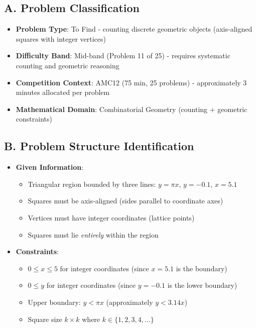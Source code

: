 \documentclass[12pt]{article}
\begin{document}
\begin{problemconfigbox}
\subsection*{A. Problem Classification}
\begin{itemize}[leftmargin=*]
    \item \textbf{Problem Type}: To Find - counting discrete geometric objects (axis-aligned squares with integer vertices)
    \item \textbf{Difficulty Band}: Mid-band (Problem 11 of 25) - requires systematic counting and geometric reasoning
    \item \textbf{Competition Context}: AMC12 (75 min, 25 problems) - approximately 3 minutes allocated per problem
    \item \textbf{Mathematical Domain}: Combinatorial Geometry (counting + geometric constraints)
\end{itemize}

\subsection*{B. Problem Structure Identification}
\begin{itemize}[leftmargin=*]
    \item \textbf{Given Information}: 
    \begin{itemize}
        \item Triangular region bounded by three lines: $y = \pi x$, $y = -0.1$, $x = 5.1$
        \item Squares must be axis-aligned (sides parallel to coordinate axes)
        \item Vertices must have integer coordinates (lattice points)
        \item Squares must lie \textit{entirely} within the region
    \end{itemize}
    
    \item \textbf{Constraints}: 
    \begin{itemize}
        \item $0 \leq x \leq 5$ for integer coordinates (since $x=5.1$ is the boundary)
        \item $0 \leq y$ for integer coordinates (since $y=-0.1$ is the lower boundary)
        \item Upper boundary: $y < \pi x$ (approximately $y < 3.14x$)
        \item Square size $k \times k$ where $k \in \{1, 2, 3, 4, \ldots\}$
    \end{itemize}
    

\end{itemize}
\end{problemconfigbox}
\end{document}
